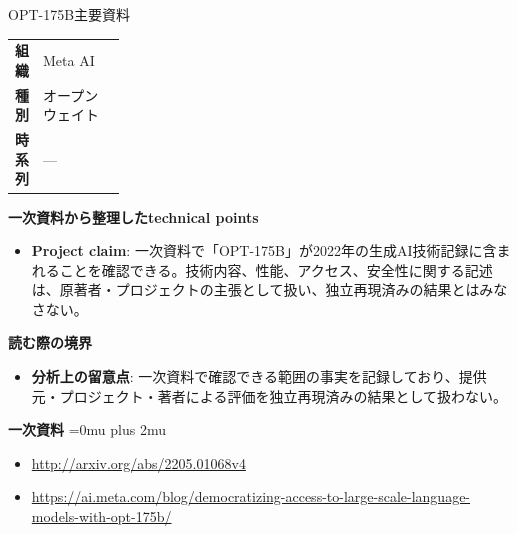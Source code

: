 \begin{technicalnote}{OPT-175B}{主要資料}
\begingroup
\begin{tabularx}{\linewidth}{@{}>{\bfseries}p{0.22\linewidth}X@{}}
組織 & Meta AI \\
種別 & オープンウェイト \\
時系列 & — \\
\end{tabularx}
\smallskip
{\bfseries 一次資料から整理したtechnical points}
\begin{itemize}[leftmargin=1.5em,itemsep=0.35em]
\item \textbf{Project claim}: 一次資料で「OPT-175B」が2022年の生成AI技術記録に含まれることを確認できる。技術内容、性能、アクセス、安全性に関する記述は、原著者・プロジェクトの主張として扱い、独立再現済みの結果とはみなさない。
\end{itemize}
\begin{minipage}{\linewidth}
{\bfseries 読む際の境界}
\begin{itemize}[leftmargin=1.5em,itemsep=0.35em]
\item \textbf{分析上の留意点}: 一次資料で確認できる範囲の事実を記録しており、提供元・プロジェクト・著者による評価を独立再現済みの結果として扱わない。
\end{itemize}
\begin{samepage}
{\bfseries 一次資料}
\begingroup\sloppy
\Urlmuskip=0mu plus 2mu\relax
\begin{itemize}[leftmargin=1.5em,itemsep=0.25em]
\item {\scriptsize\url{http://arxiv.org/abs/2205.01068v4}}
\item {\scriptsize\url{https://ai.meta.com/blog/democratizing-access-to-large-scale-language-models-with-opt-175b/}}
\end{itemize}
\endgroup
\end{samepage}
\end{minipage}
\endgroup
\end{technicalnote}
\medskip

